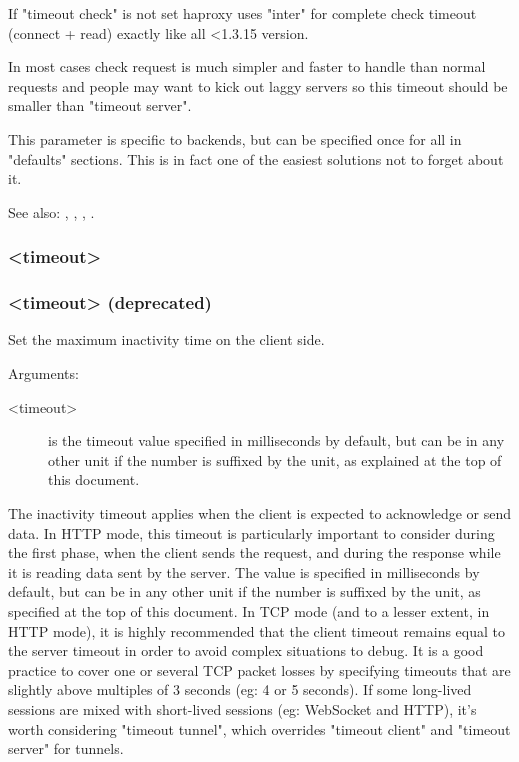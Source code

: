 {  If "timeout check" is not set haproxy uses "inter" for complete check
  timeout (connect + read) exactly like all <1.3.15 version.

  In most cases check request is much simpler and faster to handle than normal
  requests and people may want to kick out laggy servers so this timeout should
  be smaller than "timeout server".

  This parameter is specific to backends, but can be specified once for all in
  "defaults" sections. This is in fact one of the easiest solutions not to
  forget about it.

  See also: , , ,
            .

\subsubsection[timeout client]{ <timeout>}
\subsubsection[timeout clitimeout]{ <timeout> (deprecated)}


  Set the maximum inactivity time on the client side.


  Arguments:
  \begin{description}
  \item[<timeout>] is the timeout value specified in milliseconds by default, but
              can be in any other unit if the number is suffixed by the unit,
              as explained at the top of this document.
  \end{description}

  The inactivity timeout applies when the client is expected to acknowledge or
  send data. In HTTP mode, this timeout is particularly important to consider
  during the first phase, when the client sends the request, and during the
  response while it is reading data sent by the server. The value is specified
  in milliseconds by default, but can be in any other unit if the number is
  suffixed by the unit, as specified at the top of this document. In TCP mode
  (and to a lesser extent, in HTTP mode), it is highly recommended that the
  client timeout remains equal to the server timeout in order to avoid complex
  situations to debug. It is a good practice to cover one or several TCP packet
  losses by specifying timeouts that are slightly above multiples of 3 seconds
  (eg: 4 or 5 seconds). If some long-lived sessions are mixed with short-lived
  sessions (eg: WebSocket and HTTP), it's worth considering "timeout tunnel",
  which overrides "timeout client" and "timeout server" for tunnels.

}
